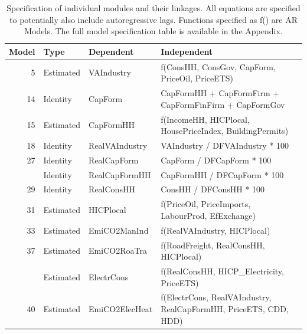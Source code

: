\begin{table}
\centering\centering
\caption{\label{tab:spec_subset}Specification of individual modules and their linkages. All equations are specified to potentially also include autoregressive lags. Functions specified as f() are AR Models. The full model specification table is available in the Appendix.}
\centering
\fontsize{8}{10}\selectfont
\begin{tabular}[t]{rll>{\raggedright\arraybackslash}p{7cm}}
\toprule
Model & Type & Dependent & Independent\\
\midrule
5 & Estimated & VAIndustry & f(ConsHH, ConsGov, CapForm, PriceOil, PriceETS)\\
14 & Identity & CapForm & CapFormHH + CapFormFirm + CapFormFinFirm + CapFormGov\\
15 & Estimated & CapFormHH & f(IncomeHH, HICPlocal, HousePriceIndex, BuildingPermits)\\
18 & Identity & RealVAIndustry & VAIndustry / DFVAIndustry * 100\\
27 & Identity & RealCapForm & CapForm / DFCapForm * 100\\
\addlinespace
28 & Identity & RealCapFormHH & CapFormHH / DFCapForm * 100\\
29 & Identity & RealConsHH & ConsHH / DFConsHH * 100\\
31 & Estimated & HICPlocal & f(PriceOil, PriceImports, LabourProd, EfExchange)\\
33 & Estimated & EmiCO2ManInd & f(RealVAIndustry, HICPlocal)\\
37 & Estimated & EmiCO2RoaTra & f(RoadFreight, RealConsHH, HICPlocal)\\
\addlinespace
39 & Estimated & ElectrCons & f(RealConsHH, HICP\_Electricity, PriceETS)\\
40 & Estimated & EmiCO2ElecHeat & f(ElectrCons, RealVAIndustry, RealCapFormHH, PriceETS, CDD, HDD)\\
\bottomrule
\end{tabular}
\end{table}
